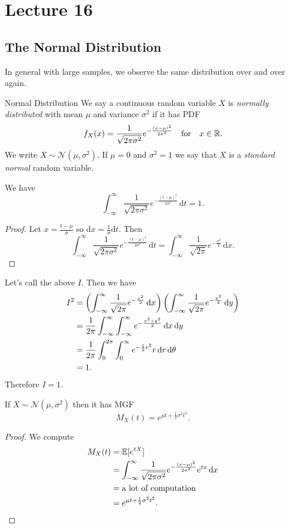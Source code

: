 \documentclass[class=article, crop=false]{standalone}
\begin{document}
  \section{Lecture 16}
  \subsection{The Normal Distribution}
  In general with large samples, we observe the same distribution over and over again.
  \begin{definition}{Normal Distribution}
    We say a continuous random variable $X$ is \emph{normally distributed} with mean $\mu$ and variance $\sigma^2$ if it has PDF
    \[
      f_X(x) = \frac{1}{\sqrt{2\pi\sigma^2}}e^{-\frac{(x - \mu)^2}{2\sigma^2}}\quad\text{for}\quad x\in\mathbb{R}.
    \]
    We write $X\sim \mathcal{N}(\mu, \sigma^2)$. If $\mu = 0$ and $\sigma^2 = 1$ we say that $X$ is a \emph{standard normal} random variable.
  \end{definition}
  \begin{theorem}{}
    We have
    \[
      \int_{-\infty}^{\infty}\frac{1}{\sqrt{2\pi\sigma^2}}e^{-\frac{(t - \mu)^2}{2\sigma^2}} \,\mathrm dt = 1.
    \]
    \begin{proof}
      Let $x = \frac{t - \mu}{\sigma}$ so $\mathrm{d}x = \frac{1}{\sigma}\mathrm{d}t$. Then
      \[
        \int_{-\infty}^{\infty}\frac{1}{\sqrt{2\pi\sigma^2}}e^{-\frac{(t - \mu)^2}{2\sigma^2}} \,\mathrm dt = \int_{-\infty}^{\infty} \frac{1}{\sqrt{2\pi}} e^{-\frac{x^2}{2}} \,\mathrm dx.
      \]
    \end{proof}
    Let's call the above $I$. Then we have
    \begin{align*}
      I^2 &= \left( \int_{-\infty}^{\infty} \frac{1}{\sqrt{2\pi}} e^{-\frac{x^2}{2}} \,\mathrm dx \right)\left( \int_{-\infty}^{\infty} \frac{1}{\sqrt{2\pi}} e^{-\frac{y^2}{2}} \,\mathrm dy \right) \\
          &= \frac{1}{2\pi} \int_{-\infty}^{\infty}\int_{-\infty}^{\infty}e^{-\frac{x^2 + y^2}{2}} \,\mathrm dx \,\mathrm dy \\
          &= \frac{1}{2\pi}\int_{0}^{2\pi}\int_{0}^{\infty} e^{-\frac{1}{2}r^2}r\,\mathrm dr \,\mathrm d\theta \\
          &= 1.
    \end{align*}
    Therefore $I = 1$.
  \end{theorem}
  \begin{theorem}{}
    If $X\sim \mathcal{N}(\mu, \sigma^2)$ then it has MGF
    \[
      M_X(t) = e^{\mu t + \frac{1}{2}\sigma^2t^2}.
    \]
    \begin{proof}
      We compute
      \begin{align*}
        M_X(t) &= \mathbb{E}[e^{tX}] \\
               &= \int_{-\infty}^{\infty} \frac{1}{\sqrt{2\pi\sigma^2}} e^{-\frac{(x - \mu)^2}{2\sigma^2}}e^{tx} \,\mathrm dx \\
               &= \text{a lot of computation} \\
               &= e^{\mu t + \frac{1}{2}\sigma^2t^2}.
      \end{align*}
    \end{proof}
  \end{theorem}
\end{document}

